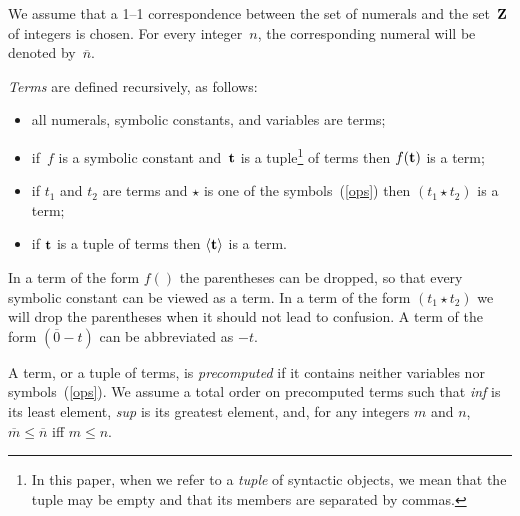 \documentclass{tlp}
\begin{document}
We assume that a 1--1 correspondence between the set of numerals and the
set~${\bf Z}$ of integers is chosen.  For every integer~$n$, the corresponding
numeral will be denoted by~$\overline n$.

{\sl Terms} are defined recursively, as follows:
\begin{itemize}
\item all numerals, symbolic constants, and variables are terms;
\item if~$f$ is a symbolic constant and~${\bf t}$ is a tuple\footnote{
In this paper, when we refer to a {\sl tuple} of syntactic objects, we mean
that the tuple may be empty and that its members are separated by commas.}
of terms then $f({\bf t})$ is a term;
\item if $t_1$ and $t_2$ are  terms and $\star$ is one of the
symbols~(\ref{ops}) then $(t_1\star t_2)$ is a  term;
\item if ${\bf t}$ is a tuple of terms then
$\langle{\bf t}\rangle$ is a term.
\end{itemize}

In a term of the form $f()$ the parentheses can be dropped, so that every
symbolic constant can be viewed as a term.  In a term of the form
$(t_1\star t_2)$ we will drop the parentheses when it should not lead to
confusion. A term of the form $(\overline 0 - t)$ can be abbreviated as $-t$.

A term, or a tuple of terms, is {\sl precomputed} if it contains neither
variables nor symbols~(\ref{ops}).
We assume a total order on precomputed terms such that {\it inf} is its least
element, {\it sup} is its greatest element, and,
for any integers $m$ and $n$, $\overline m \leq \overline n$ iff $m \leq n$.
\end{document}
